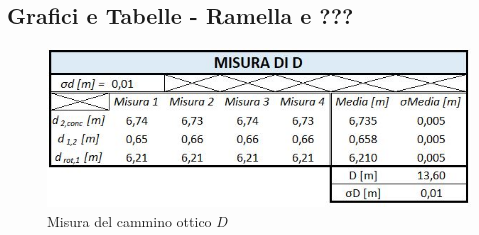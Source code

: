 \documentclass{article}
\begin{document}
\FloatBarrier %

\subsection{Grafici e Tabelle - Ramella e ???} \label{RAM}

\begin{figure}[h]
    \centering
    \includegraphics[width=0.6\linewidth]{RAM_D.JPG}
    \caption{Misura del cammino ottico $D$}
    \label{RAM_D}
\end{figure}

\end{document}
